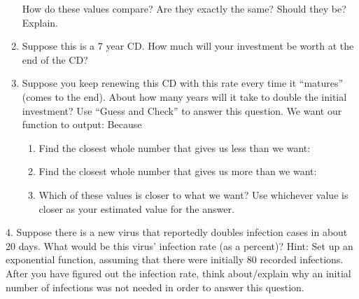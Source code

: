 \documentclass{ximera}
\begin{document}
\begin{example}
\begin{enumerate}
How do these values compare?  Are they exactly the same?  Should they be?  Explain.
\item Suppose this is a 7 year CD.  How much will your investment be worth at the end of the CD?
\item Suppose you keep renewing this CD with this rate every time it ``matures'' (comes to the end).  About how many years will it take to double the initial investment?
Use ``Guess and Check'' to answer this question.
We want our function to output:
Because 
\begin{enumerate}
\item  Find the closest whole number that gives us less than we want:
\item Find the closest whole number that gives us more than we want:
\item Which of these values is closer to what we want?  Use whichever value is closer as your estimated value for the answer.
\end{enumerate}
\end{enumerate}
\end{example}
\begin{exploration}
4.	Suppose there is a new virus that reportedly doubles infection cases in about 20 days.  What would be this virus' infection rate (as a percent)?
Hint: Set up an exponential function, assuming that there were initially 80 recorded infections.  After you have figured out the infection rate, think about/explain why an initial number of infections was not needed in order to answer this question.

\end{exploration}
\end{document}
